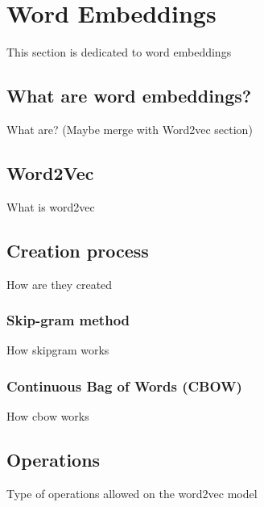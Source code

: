 \chapter{Word Embeddings}
\label{chap:words}

This section is dedicated to word embeddings

\section{What are word embeddings?}
\label{sec:words_what}

What are? (Maybe merge with Word2vec section)

\section{Word2Vec}
\label{sec:words_word2vec}

What is word2vec

\section{Creation process}
\label{sec:words_creation}

How are they created

\subsection{Skip-gram method}
\label{subsec:words_creation_skipgram}

How skipgram works

\subsection{Continuous Bag of Words (CBOW)}
\label{subsec:words_creation_cbow}

How cbow works

\section{Operations}
\label{sec:words_operations}

Type of operations allowed on the word2vec model





